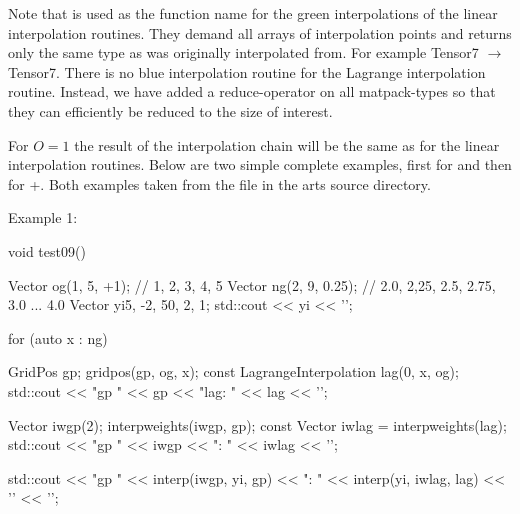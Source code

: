 Note that  is used as the function name 
for the green interpolations of the linear interpolation routines.
They demand all arrays of interpolation points and returns only the
same type as was originally interpolated from.  For example Tensor7 $\rightarrow$ Tensor7.
There is no blue interpolation routine for the Lagrange interpolation
routine.  Instead, we have added a reduce-operator on all matpack-types
so that they can efficiently be reduced to the size of interest.

For $O=1$ the result of the
interpolation chain will be the same as for the linear interpolation
routines. Below are two simple complete examples, first for  and then for +.
Both examples taken from the file  in the arts source directory.

Example 1:
\begin{code}
void test09() {
  Vector og(1, 5, +1);    // 1, 2, 3, 4, 5
  Vector ng(2, 9, 0.25);  // 2.0, 2,25, 2.5, 2.75, 3.0 ... 4.0
  Vector yi{5, -2, 50, 2, 1};
  std::cout << yi << '\n';

  for (auto x : ng) {
    GridPos gp;
    gridpos(gp, og, x);
    const LagrangeInterpolation lag(0, x, og);
    std::cout << "gp " << gp << "lag: " << lag << '\n';

    Vector iwgp(2);
    interpweights(iwgp, gp);
    const Vector iwlag = interpweights(lag);
    std::cout << "gp " << iwgp << "\nlag: " << iwlag << '\n';

    std::cout << "gp " << interp(iwgp, yi, gp)
              << "\nlag: " << interp(yi, iwlag, lag) << '\n'
              << '\n';
  }
}
\end{code}

